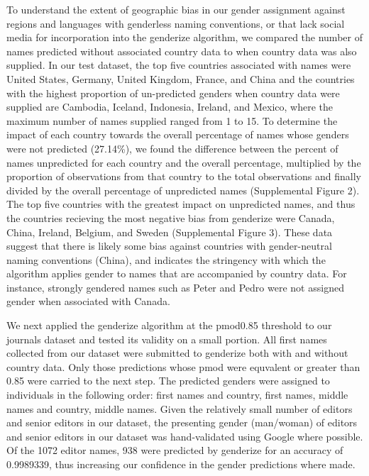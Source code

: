 \documentclass[11pt,]{article}
\begin{document}
To understand the extent of geographic bias in our gender assignment
against regions and languages with genderless naming conventions, or
that lack social media for incorporation into the genderize algorithm,
we compared the number of names predicted without associated country
data to when country data was also supplied. In our test dataset, the
top five countries associated with names were United States, Germany,
United Kingdom, France, and China and the countries with the highest
proportion of un-predicted genders when country data were supplied are
Cambodia, Iceland, Indonesia, Ireland, and Mexico, where the maximum
number of names supplied ranged from 1 to 15. To determine the impact of
each country towards the overall percentage of names whose genders were
not predicted (27.14\%), we found the difference between the percent of
names unpredicted for each country and the overall percentage,
multiplied by the proportion of observations from that country to the
total observations and finally divided by the overall percentage of
unpredicted names (Supplemental Figure 2). The top five countries with
the greatest impact on unpredicted names, and thus the countries
recieving the most negative bias from genderize were Canada, China,
Ireland, Belgium, and Sweden (Supplemental Figure 3). These data suggest
that there is likely some bias against countries with gender-neutral
naming conventions (China), and indicates the stringency with which the
algorithm applies gender to names that are accompanied by country data.
For instance, strongly gendered names such as Peter and Pedro were not
assigned gender when associated with Canada.

We next applied the genderize algorithm at the pmod0.85 threshold to our
journals dataset and tested its validity on a small portion. All first
names collected from our dataset were submitted to genderize both with
and without country data. Only those predictions whose pmod were
equvalent or greater than 0.85 were carried to the next step. The
predicted genders were assigned to individuals in the following order:
first names and country, first names, middle names and country, middle
names. Given the relatively small number of editors and senior editors
in our dataset, the presenting gender (man/woman) of editors and senior
editors in our dataset was hand-validated using Google where possible.
Of the 1072 editor names, 938 were predicted by genderize for an
accuracy of 0.9989339, thus increasing our confidence in the gender
predictions where made.
\end{document}
